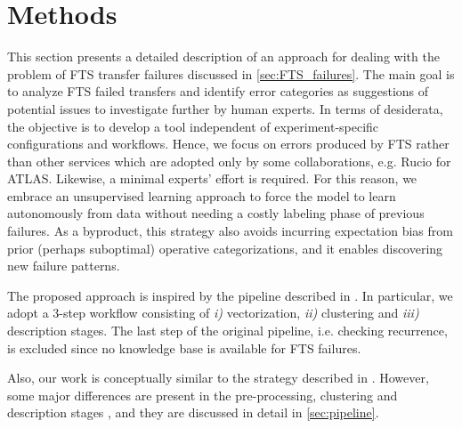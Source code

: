 \chapter{Methods}

This section presents a detailed description of an approach for dealing with the problem of FTS transfer failures discussed in \cref{sec:FTS_failures}.
The main goal is to analyze FTS failed transfers and identify error categories as suggestions of potential issues to investigate further by human experts.
In terms of desiderata, the objective is to develop a tool independent of experiment-specific configurations and workflows. Hence, we focus on errors produced by FTS rather than other services which are adopted only by some collaborations, e.g. Rucio for ATLAS.
Likewise, a minimal experts' effort is required. For this reason, we embrace an unsupervised learning approach to force the model to learn autonomously from data without needing a costly labeling phase of previous failures.
As a byproduct, this strategy also avoids incurring expectation bias from prior (perhaps suboptimal) operative categorizations, and it enables discovering new failure patterns.

The proposed approach \cite[Section 2.19]{opint2022} is inspired by the pipeline described in . %
In particular, we adopt a 3-step workflow consisting of \textit{i)} vectorization, \textit{ii)} clustering and \textit{iii)} description stages. 
The last step of the original pipeline, i.e. checking recurrence, is excluded since no knowledge base is available for FTS failures.

Also, our work is conceptually similar to the strategy described in . However, some major differences are present in the pre-processing, clustering and description stages%
, and they are discussed in detail in \cref{sec:pipeline}.
